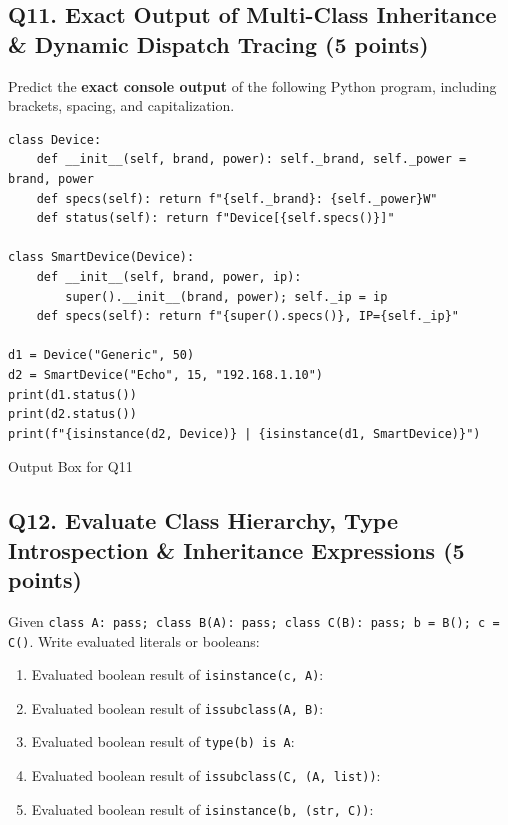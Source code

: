 \documentclass[11pt,a4paper]{article}
\begin{document}
\subsection*{Q11. Exact Output of Multi-Class Inheritance \& Dynamic Dispatch Tracing (5 points)}
Predict the \textbf{exact console output} of the following Python program, including brackets, spacing, and capitalization.
\begin{lstlisting}
class Device:
    def __init__(self, brand, power): self._brand, self._power = brand, power
    def specs(self): return f"{self._brand}: {self._power}W"
    def status(self): return f"Device[{self.specs()}]"

class SmartDevice(Device):
    def __init__(self, brand, power, ip):
        super().__init__(brand, power); self._ip = ip
    def specs(self): return f"{super().specs()}, IP={self._ip}"

d1 = Device("Generic", 50)
d2 = SmartDevice("Echo", 15, "192.168.1.10")
print(d1.status())
print(d2.status())
print(f"{isinstance(d2, Device)} | {isinstance(d1, SmartDevice)}")
\end{lstlisting}
\begin{answerbox}[height=2.5cm]{Output Box for Q11}\end{answerbox}
\newpage

\subsection*{Q12. Evaluate Class Hierarchy, Type Introspection \& Inheritance Expressions (5 points)}
Given \texttt{class A: pass; class B(A): pass; class C(B): pass; b = B(); c = C()}. Write evaluated literals or booleans:
\begin{enumerate}[label=\alph*),leftmargin=2em,itemsep=1pt]
\item Evaluated boolean result of \lstinline|isinstance(c, A)|: \hrulefill
\item Evaluated boolean result of \lstinline|issubclass(A, B)|: \hrulefill
\item Evaluated boolean result of \lstinline|type(b) is A|: \hrulefill
\item Evaluated boolean result of \lstinline|issubclass(C, (A, list))|: \hrulefill
\item Evaluated boolean result of \lstinline|isinstance(b, (str, C))|: \hrulefill
\end{enumerate}
\vspace{-2mm}
\end{document}
